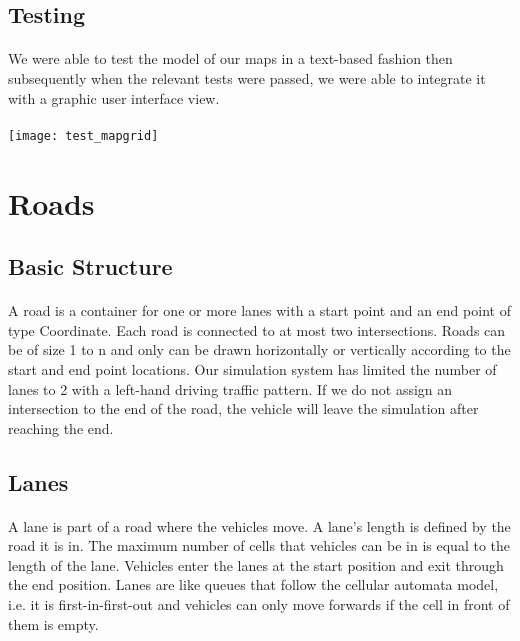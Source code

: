 \documentclass[a4paper,11pt,titlepage]{article}
\begin{document}
\subsection{Testing}
\paragraph{}
We were able to test the model of our maps in a text-based fashion then subsequently when the relevant tests were passed, we were able to integrate it with a graphic user interface view.
\paragraph{}
\centerline{ \texttt{[image: test\_mapgrid]}}

\section{Roads}\label{roadsection}
\subsection{Basic Structure}
\paragraph{}
A road is a container for one or more lanes with a start point and an end point of type Coordinate. Each road is connected to at most two intersections. Roads can be of size 1 to n and only can be drawn horizontally or vertically according to the start and end point locations. Our simulation system has limited the number of lanes to 2 with a left-hand driving traffic pattern. If we do not assign an intersection to the end of the road, the vehicle will leave the simulation after reaching the end.
\subsection{Lanes}
\paragraph{}
A lane is part of a road where the vehicles move. A lane's length is defined by the road it is in. The maximum number of cells that vehicles can be in is equal to the length of the lane. Vehicles enter the lanes at the start position and exit through the end position. Lanes are like queues that follow the cellular automata model, i.e. it is first-in-first-out and vehicles can only move forwards if the cell in front of them is empty. 
\end{document}
